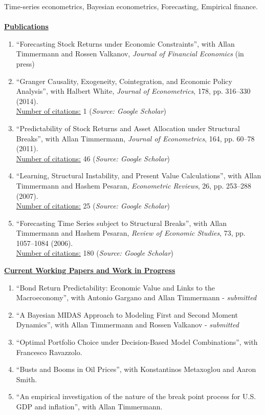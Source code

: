 \documentclass[12pt]{article}
\begin{document}
Time-series econometrics, Bayesian econometrics, Forecasting, Empirical finance.\\ \\
\underline{\textbf{Publications}}
\begin{enumerate}	
	\item ``Forecasting Stock Returns under Economic Constraints'', with Allan Timmermann and Rossen Valkanov, \emph{Journal of Financial Economics} (in press)
	
	\item ``Granger Causality, Exogeneity, Cointegration, and Economic Policy Analysis'', with Halbert White, \emph{Journal of Econometrics}, 178, pp. 316--330 (2014). \\
	\underline{Number of citations:} 1 (\emph{Source: Google Scholar})
	
	\item ``Predictability of Stock Returns and Asset Allocation under Structural Breaks'', with Allan Timmermann, \emph{Journal of Econometrics}, 164, pp. 60--78 (2011). \\
	\underline{Number of citations:} 46 (\emph{Source: Google Scholar})
	
	\item ``Learning, Structural Instability, and Present Value Calculations'', with Allan Timmermann and Hashem Pesaran, \emph{Econometric Reviews}, 26, pp. 253--288 (2007). \\
	\underline{Number of citations:} 25 (\emph{Source: Google Scholar})

	\item ``Forecasting Time Series subject to Structural Breaks'', with Allan Timmermann and Hashem Pesaran, \emph{Review of Economic Studies}, 73, pp. 1057--1084 (2006). \\
	\underline{Number of citations:} 180 (\emph{Source: Google Scholar})

    \setcounter{enumTemp}{\theenumi}
 \end{enumerate}
\underline{\textbf{Current Working Papers and Work in Progress}}
\begin{enumerate}
	\setcounter{enumi}{\theenumTemp}
	\item ``Bond Return Predictability: Economic Value and Links to the Macroeconomy'', with Antonio Gargano and Allan Timmermann - \textit{submitted}
	\item ``A Bayesian MIDAS Approach to Modeling First and Second Moment Dynamics'', with Allan Timmermann and Rossen Valkanov - \textit{submitted}
	\item ``Optimal Portfolio Choice under Decision-Based Model Combinations'', with Francesco Ravazzolo.
	\item ``Busts and Booms in Oil Prices'', with Konstantinos Metaxoglou  and Aaron Smith.
	\item ``An empirical investigation of the nature of the break point process for U.S. GDP and inflation'', with Allan Timmermann.
\end{enumerate}
\end{document}

